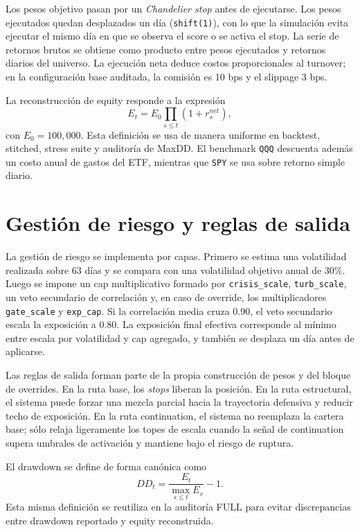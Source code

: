 \documentclass[11pt]{article}
\begin{document}
Los pesos objetivo pasan por un \textit{Chandelier stop} antes de ejecutarse. Los pesos ejecutados quedan desplazados un d\'ia (\texttt{shift(1)}), con lo que la simulaci\'on evita ejecutar el mismo d\'ia en que se observa el score o se activa el stop. La serie de retornos brutos se obtiene como producto entre pesos ejecutados y retornos diarios del universo. La ejecuci\'on neta deduce costos proporcionales al turnover; en la configuraci\'on base auditada, la comisi\'on es 10 bps y el slippage 3 bps.

La reconstrucci\'on de equity responde a la expresi\'on
\begin{equation}
E_t = E_0 \prod_{s \le t}(1 + r^{net}_s),
\end{equation}
con $E_0=100{,}000$. Esta definici\'on se usa de manera uniforme en backtest, stitched, stress suite y auditor\'ia de MaxDD. El benchmark \texttt{QQQ} descuenta adem\'as un costo anual de gastos del ETF, mientras que \texttt{SPY} se usa sobre retorno simple diario.

\section{Gesti\'on de riesgo y reglas de salida}
La gesti\'on de riesgo se implementa por capas. Primero se estima una volatilidad realizada sobre 63 d\'ias y se compara con una volatilidad objetivo anual de 30\%. Luego se impone un cap multiplicativo formado por \texttt{crisis\_scale}, \texttt{turb\_scale}, un veto secundario de correlaci\'on y, en caso de override, los multiplicadores \texttt{gate\_scale} y \texttt{exp\_cap}. Si la correlaci\'on media cruza 0.90, el veto secundario escala la exposici\'on a 0.80. La exposici\'on final efectiva corresponde al m\'inimo entre escala por volatilidad y cap agregado, y tambi\'en se desplaza un d\'ia antes de aplicarse.

Las reglas de salida forman parte de la propia construcci\'on de pesos y del bloque de overrides. En la ruta base, los \textit{stops} liberan la posici\'on. En la ruta estructural, el sistema puede forzar una mezcla parcial hacia la trayectoria defensiva y reducir techo de exposici\'on. En la ruta continuation, el sistema no reemplaza la cartera base; s\'olo relaja ligeramente los topes de escala cuando la se\~nal de continuation supera umbrales de activaci\'on y mantiene bajo el riesgo de ruptura.

El drawdown se define de forma can\'onica como
\begin{equation}
DD_t = \frac{E_t}{\max_{s \le t} E_s} - 1.
\end{equation}
Esta misma definici\'on se reutiliza en la auditor\'ia FULL para evitar discrepancias entre drawdown reportado y equity reconstruida.
\end{document}
